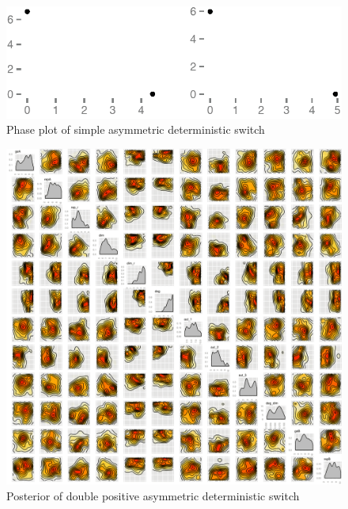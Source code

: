 \begin{figure}[htbp]
\begin{center}
\includegraphics[scale=0.15]{chapterModelling/mass_action_switches/deterministic/asym/cl_det_phase.png}
\caption{Phase plot of simple asymmetric deterministic switch}\label{fig:asym_det_cl_ma_phase}
\end{center}
\end{figure}

\begin{figure}[htbp]
\begin{center}
\includegraphics[scale=0.1]{chapterModelling/mass_action_switches/deterministic/asym/posterior_dp.png}
\caption{Posterior of double positive asymmetric deterministic switch}\label{fig:asym_det_dp_ma_post}
\end{center}
\end{figure}

